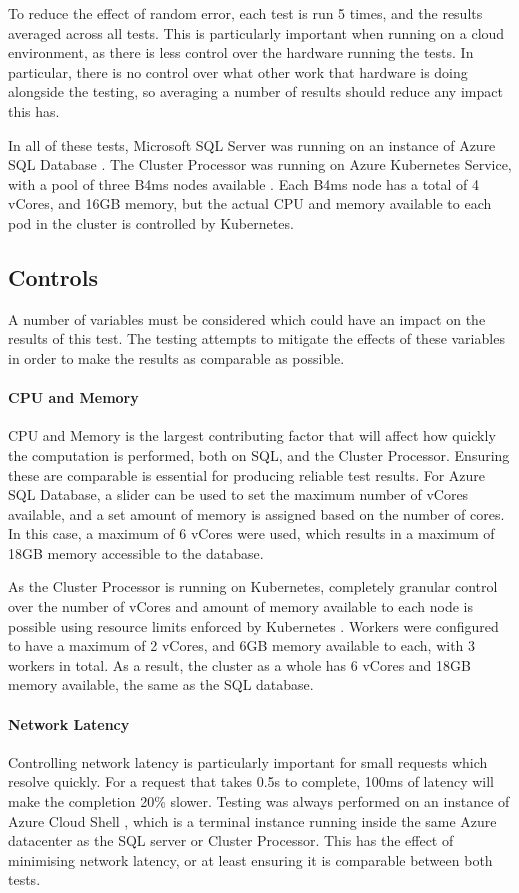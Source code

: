To reduce the effect of random error, each test is run 5 times, and the results averaged across all tests. This is particularly important when running on a cloud environment, as there is less control over the hardware running the tests. In particular, there is no control over what other work that hardware is doing alongside the testing, so averaging a number of results should reduce any impact this has.

In all of these tests, Microsoft SQL Server was running on an instance of Azure SQL Database . The Cluster Processor was running on Azure Kubernetes Service, with a pool of three B4ms nodes available . Each B4ms node has a total of 4 vCores, and 16GB memory, but the actual CPU and memory available to each pod in the cluster is controlled by Kubernetes.

\subsection{Controls}
A number of variables must be considered which could have an impact on the results of this test. The testing attempts to mitigate the effects of these variables in order to make the results as comparable as possible.

\paragraph{CPU and Memory}
CPU and Memory is the largest contributing factor that will affect how quickly the computation is performed, both on SQL, and the Cluster Processor. Ensuring these are comparable is essential for producing reliable test results. For Azure SQL Database, a slider can be used to set the maximum number of vCores available, and a set amount of memory is assigned based on the number of cores. In this case, a maximum of 6 vCores were used, which results in a maximum of 18GB memory accessible to the database.

As the Cluster Processor is running on Kubernetes, completely granular control over the number of vCores and amount of memory available to each node is possible using resource limits enforced by Kubernetes . Workers were configured to have a maximum of 2 vCores, and 6GB memory available to each, with 3 workers in total. As a result, the cluster as a whole has 6 vCores and 18GB memory available, the same as the SQL database.

\paragraph{Network Latency}
Controlling network latency is particularly important for small requests which resolve quickly. For a request that takes 0.5s to complete, 100ms of latency will make the completion 20\% slower. Testing was always performed on an instance of Azure Cloud Shell , which is a terminal instance running inside the same Azure datacenter as the SQL server or Cluster Processor. This has the effect of minimising network latency, or at least ensuring it is comparable between both tests.

